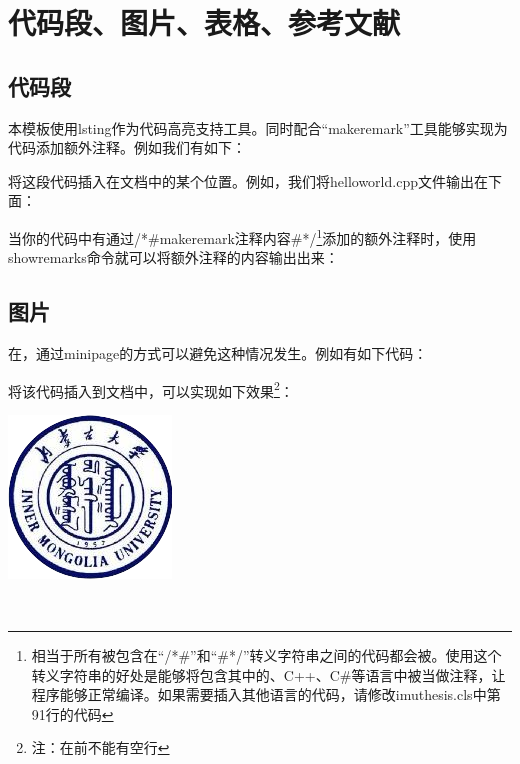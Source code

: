 \chapter{代码段、图片、表格、参考文献}

    \section{代码段}
        本模板使用lsting作为代码高亮支持工具。同时配合“\tbs makeremark”工具能够实现为代码添加额外注释。例如我们有如下：
        \begin{quote}
            
        \end{quote}

        将这段代码插入在文档中的某个位置。例如，我们将helloworld.cpp文件输出在下面：
        
        
        当你的代码中有通过/*\#\tbs makeremark{注释内容}\#*/\footnote{相当于所有被包含在“/*\#”和“\#*/”转义字符串之间的代码都会被。使用这个转义字符串的好处是能够将包含其中的、C++、C\#等语言中被当做注释，让程序能够正常编译。如果需要插入其他语言的代码，请修改imuthesis.cls中第91行的代码}添加的额外注释时，使用\tbs showremarks命令就可以将额外注释的内容输出出来：
        \begin{quote}
            \showremarks
        \end{quote}

    \section{图片}
        在，通过minipage的方式可以避免这种情况发生。例如有如下代码：
        
        
        将该代码插入到文档中，可以实现如下效果\footnote{注：在\tbs{}前不能有空行}：
        \\[\intextsep] 
            \begin{minipage}{\textwidth} 
                \centering
                \includegraphics{figure/emblem.png}
                \label{fig:emblem} 
            \end{minipage}
        \\[\intextsep] 

